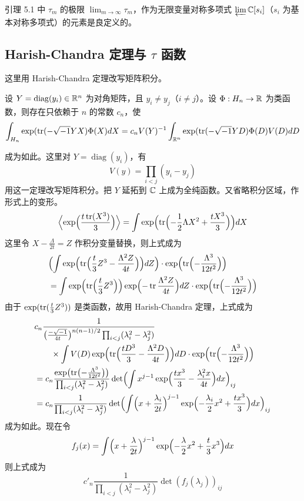 \begin{corollary}
引理 5.1 中 $\tau_m$ 的极限 $\lim_{m\to\infty}\tau_m$，作为无限变量对称多项式 $\varprojlim\mathbb{C}[s_i]$（$s_i$ 为基本对称多项式）的元素是良定义的。
\end{corollary}

\subsection{Harish-Chandra 定理与 $\tau$ 函数}

这里用 Harish-Chandra 定理改写矩阵积分。

\begin{theorem}
设 $Y=\operatorname{diag}(y_i)\in\mathbb{R}^n$ 为对角矩阵，且 $y_i\ne y_j$（$i\ne j$）。设 $\Phi:H_n\to\mathbb{R}$ 为类函数，则存在只依赖于 $n$ 的常数 $c_n$，使
\[
\int_{H_n}\exp(\operatorname{tr}(-\sqrt{-1}YX)\Phi(X)dX
=c_nV(Y)^{-1}\int_{\mathbb{R}^n}\exp(\operatorname{tr}(-\sqrt{-1}YD)\Phi(D)V(D)dD
\]
\end{theorem}


成为如此。这里对 $Y=\operatorname{diag}(y_i)$，有
\[
V(y)=\prod_{i<j}(y_i-y_j)
\]
用这一定理改写矩阵积分。把 $Y$ 延拓到 $\mathbb{C}$ 上成为全纯函数。又省略积分区域，作形式上的变形。
\[
\Bigl\langle\exp\Bigl(\frac{t\operatorname{tr}(X^3)}{3}\Bigr)\Bigr\rangle
=\int\exp\Bigl(\operatorname{tr}\Bigl(-\frac{1}{2}\Lambda X^2+\frac{tX^3}{3}\Bigr)\Bigr)dX
\]
这里令 $X-\frac{\Lambda}{2t}=Z$ 作积分变量替换，则上式成为
\[
\begin{aligned}
&\Bigl(\int\exp\Bigl(\operatorname{tr}\Bigl(\frac{t}{3}Z^3-\frac{\Lambda^2Z}{4t}\Bigr)\Bigr)dZ\Bigr)\cdot\exp\Bigl(\operatorname{tr}\Bigl(-\frac{\Lambda^3}{12t^2}\Bigr)\Bigr)\\
&=\int\exp\Bigl(\operatorname{tr}\Bigl(\frac{t}{3}Z^3\Bigr)\Bigr)\exp\Bigl(-\operatorname{tr}\frac{\Lambda^2Z}{4t}\Bigr)dZ\cdot\exp\Bigl(\operatorname{tr}\Bigl(-\frac{\Lambda^3}{12t^2}\Bigr)\Bigr)
\end{aligned}
\]
由于 $\exp(\operatorname{tr}(\frac{t}{3}Z^3))$ 是类函数，故用 Harish-Chandra 定理，上式成为
\[
\begin{aligned}
&c_n\frac{1}{\bigl(\frac{-\sqrt{-1}}{4t}\bigr)^{n(n-1)/2}\prod_{i<j}(\lambda_i^2-\lambda_j^2)}\\
&\qquad\times\int V(D)\exp\Bigl(\operatorname{tr}\Bigl(\frac{tD^3}{3}-\frac{\Lambda^2D}{4t}\Bigr)\Bigr)dD\cdot\exp\Bigl(\operatorname{tr}\Bigl(-\frac{\Lambda^3}{12t^2}\Bigr)\Bigr)\\
&=c_n\frac{\exp\bigl(\operatorname{tr}\bigl(-\frac{\Lambda^3}{12t^2}\bigr)\bigr)}{\prod_{i<j}(\lambda_i^2-\lambda_j^2)}
\det\Bigl(\int x^{j-1}\exp\Bigl(\frac{tx^3}{3}-\frac{\lambda_i^2x}{4t}\Bigr)dx\Bigr)_{ij}\\
&=c_n\frac{1}{\prod_{i<j}(\lambda_i^2-\lambda_j^2)}
\det\Bigl(\int\Bigl(x+\frac{\lambda_i}{2t}\Bigr)^{j-1}
\exp\Bigl(-\frac{\lambda_i}{2}x^2+\frac{tx^3}{3}\Bigr)dx\Bigr)_{ij}
\end{aligned}
\]
成为如此。现在令
\[
f_j(x)=\int\Bigl(x+\frac{\lambda}{2t}\Bigr)^{j-1}
\exp\Bigl(-\frac{\lambda}{2}x^2+\frac{t}{3}x^3\Bigr)dx
\]
则上式成为
\[
c'_n\frac{1}{\prod_{i<j}(\lambda_i^2-\lambda_j^2)}\det(f_j(\lambda_j))_{ij}
\]

